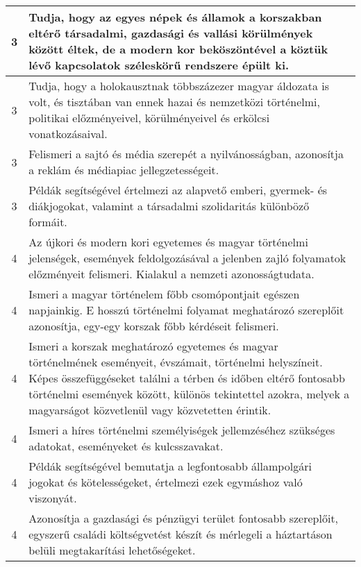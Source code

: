 \begin{longtable}{c | p{12cm} }
                                
                                          3 &  Tudja, hogy az egyes népek és államok a korszakban eltérő társadalmi, gazdasági és vallási körülmények között éltek, de a modern kor beköszöntével a köztük lévő kapcsolatok széleskörű rendszere épült ki. \\ \hline
                                          3 &  Tudja, hogy a holokausztnak többszázezer magyar áldozata is volt, és  tisztában van ennek hazai és nemzetközi történelmi, politikai előzményeivel, körülményeivel és erkölcsi vonatkozásaival. \\ \hline
                                          3 &  Felismeri a sajtó és média szerepét a nyilvánosságban, azonosítja a reklám és médiapiac jellegzetességeit. \\ \hline
                                          3 &  Példák segítségével értelmezi az alapvető emberi, gyermek- és diákjogokat, valamint a társadalmi szolidaritás különböző formáit. \\ \hline
                                      
                                
                                          4 &  Az újkori és modern kori egyetemes és magyar történelmi jelenségek, események feldolgozásával a jelenben zajló folyamatok előzményeit felismeri. Kialakul a nemzeti azonosságtudata. \\ \hline
                                          4 &  Ismeri a magyar történelem főbb csomópontjait egészen napjainkig. E hosszú történelmi folyamat meghatározó szereplőit azonosítja, egy-egy korszak főbb kérdéseit felismeri. \\ \hline
                                          4 &  Ismeri a korszak meghatározó egyetemes és magyar történelmének eseményeit, évszámait, történelmi helyszíneit. Képes összefüggéseket találni a térben és időben eltérő fontosabb történelmi események között, különös tekintettel azokra, melyek a magyarságot közvetlenül vagy közvetetten érintik. \\ \hline
                                          4 &  Ismeri a híres történelmi személyiségek jellemzéséhez szükséges adatokat, eseményeket és kulcsszavakat. \\ \hline
                                          4 &  Példák segítségével bemutatja a legfontosabb állampolgári jogokat és kötelességeket, értelmezi ezek egymáshoz való viszonyát. \\ \hline
                                          4 &  Azonosítja a gazdasági és pénzügyi terület fontosabb szereplőit, egyszerű családi költségvetést készít és mérlegeli a háztartáson belüli megtakarítási lehetőségeket. \\ \hline
                                      
                        \end{longtable}
            \clearpage

